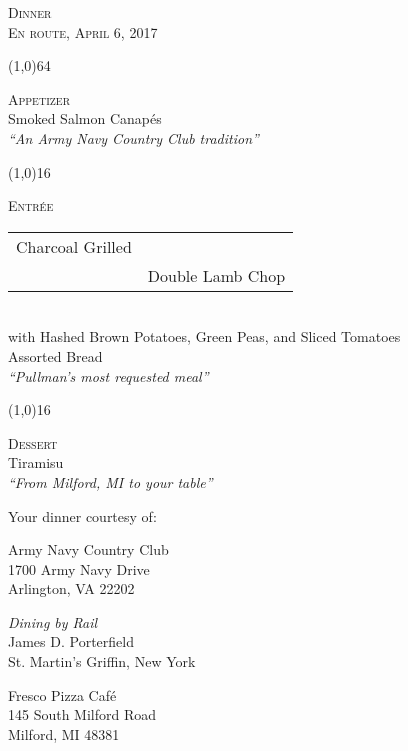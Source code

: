 \documentclass{article}
\newcommand\shortline[1]{
  \begin{center}
    \line(1,0){#1}
  \end{center}
}
\newcommand\course[3]{
  \begin{center}
    \textsc{\large #1} \\
    #2 \\
    {\small \emph{``#3''}}
  \end{center}
}
\begin{document}
\begin{center}
  \textsc{\Large Dinner} \\
  \textsc{En route, April 6, 2017}
\end{center}

\shortline{64}

\course{Appetizer}{Smoked Salmon Canap\'{e}s}{An Army Navy Country Club tradition}

\shortline{16}

\course{Entr\'{e}e}{\begin{tabular}{rl}
  Charcoal Grilled & \\
  & Double Lamb Chop \\
  \end{tabular} \\
  {\scriptsize with Hashed Brown Potatoes, Green Peas, and Sliced Tomatoes \\
    Assorted Bread}
}{Pullman's most requested meal}

\shortline{16}

\course{Dessert}{Tiramisu}{From Milford, MI to your table}

\newpage

\begin{center}
  Your dinner courtesy of:
\end{center}

\begin{center}
  Army Navy Country Club \\
  1700 Army Navy Drive \\
  Arlington, VA 22202
\end{center}

\begin{center}
  \emph{Dining by Rail} \\
  James D. Porterfield \\
  St. Martin's Griffin, New York
\end{center}

\begin{center}
  Fresco Pizza Caf\'{e} \\
  145 South Milford Road \\
  Milford, MI 48381
\end{center}
\end{document}
